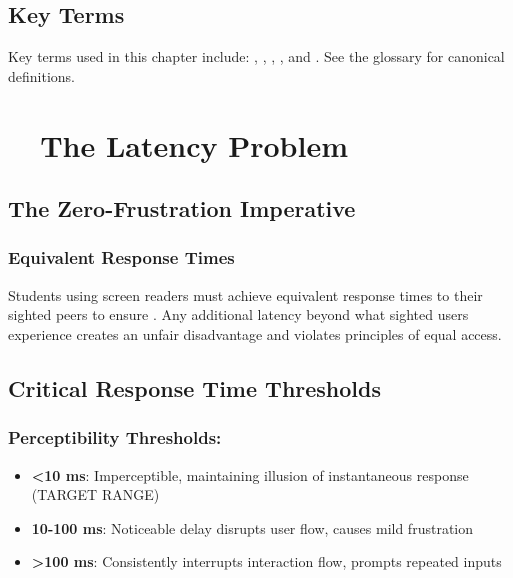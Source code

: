 \subsection{Key Terms}\label{chap1:key-terms}
Key terms used in this chapter include: , , , , and . See the glossary for canonical definitions.

\section{~~The Latency Problem}\label{the-latency-problem}

\subsection{The Zero-Frustration Imperative}\label{the-zero-frustration-imperative}

\subsubsection{Equivalent Response Times}

Students using screen readers must achieve equivalent response times to their sighted peers to ensure . Any additional latency beyond what sighted users experience creates an unfair disadvantage and violates principles of equal access.\supercite{ADA1990, Section508}

\subsection{Critical Response Time Thresholds}\label{critical-response-time-thresholds}

\subsubsection{Perceptibility Thresholds:}

\begin{itemize}
	\item \textbf{<10 ms}: Imperceptible, maintaining illusion of instantaneous response (TARGET RANGE) \supercite{Nielsen1993UsabilityEngineering}
	\item \textbf{10-100 ms}: Noticeable delay disrupts user flow, causes mild frustration \supercite{Miller1968ReactionTime}
	\item \textbf{>100 ms}: Consistently interrupts interaction flow, prompts repeated inputs \supercite{Shneiderman1998DesigningTheUserInterface}
\end{itemize}


